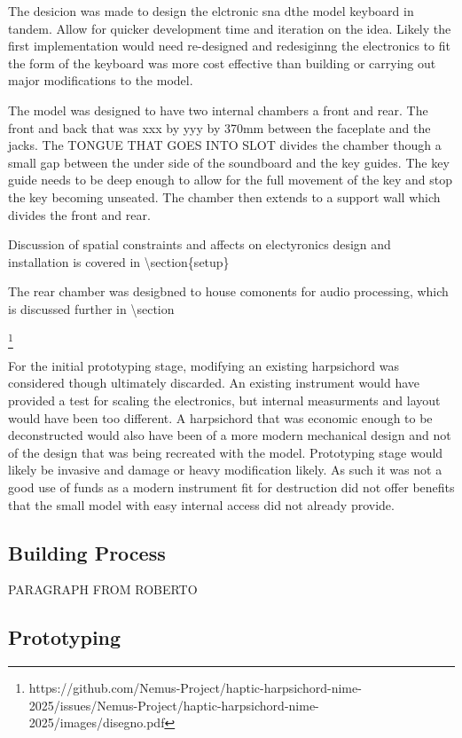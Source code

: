 The desicion was made to design the elctronic sna dthe model keyboard in
tandem. Allow for quicker development time and iteration on the idea.
Likely the first implementation would need re-designed and redesiginng
the electronics to fit the form of the keyboard was more cost effective
than building or carrying out major modifications to the model.

The model was designed to have two internal chambers a front and rear.
The front and back that was xxx by yyy by 370mm between the faceplate
and the jacks. The TONGUE THAT GOES INTO SLOT divides the chamber though
a small gap between the under side of the soundboard and the key guides.
The key guide needs to be deep enough to allow for the full movement of
the key and stop the key becoming unseated. The chamber then extends to
a support wall which divides the front and rear.

Discussion of spatial constraints and affects on electyronics design and
installation is covered in \textbackslash section\{setup\}

The rear chamber was desigbned to house comonents for audio processing,
which is discussed further in \textbackslash section

\footnote{https://github.com/Nemus-Project/haptic-harpsichord-nime-2025/issues/Nemus-Project/haptic-harpsichord-nime-2025/images/disegno.pdf}

For the initial prototyping stage, modifying an existing harpsichord was
considered though ultimately discarded. An existing instrument would
have provided a test for scaling the electronics, but internal
measurments and layout would have been too different. A harpsichord that
was economic enough to be deconstructed would also have been of a more
modern mechanical design and not of the design that was being recreated
with the model. Prototyping stage would likely be invasive and damage or
heavy modification likely. As such it was not a good use of funds as a
modern instrument fit for destruction did not offer benefits that the
small model with easy internal access did not already provide.

\subsection{Building Process}\label{building-process}

PARAGRAPH FROM ROBERTO

\subsection{Prototyping}\label{prototyping}

